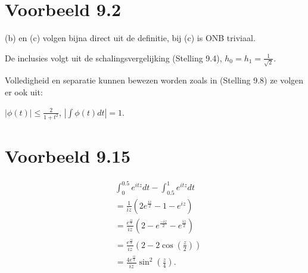 \documentclass{article}
\begin{document}
\section{Voorbeeld 9.2}

 (b) en (c) volgen bijna direct uit de definitie, bij (c) is ONB triviaal.

De inclusies volgt uit de schalingsvergelijking (Stelling 9.4), $h_{0}=h_{1} = \frac{1}{\sqrt{2}}$.

Volledigheid en separatie kunnen bewezen worden zoals in (Stelling 9.8) ze volgen er ook uit:

$|\phi(t)| \le \frac{2}{1 + t^{2}} $, $| \int \phi(t)dt | = 1 $.

\section{Voorbeeld 9.15}

\begin{align*}
     & \int_{0}^{0.5} e^{itz} dt - \int_{0.5}^{1} e^{itz} dt                                 \\
     & = \frac{1}{iz} \left( 2 e^{\frac{iz}{2}} - 1 - e^{iz} \right)                         \\
     & = \frac{e^{\frac{iz}{2}}}{iz} \left( 2 - e^{\frac{-iz}{2}} - e^{\frac{iz}{2}} \right) \\
     & = \frac{e^{\frac{iz}{2}}}{iz} \left( 2 - 2 \cos \left( \frac{z}{2} \right) \right)    \\
     & = \frac{4 e^{\frac{iz}{2}}}{iz} \sin^{2} \left( \frac{z}{4} \right)
    .
\end{align*}
\end{document}
